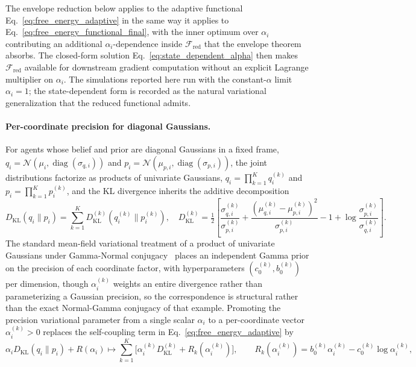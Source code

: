 \documentclass[11pt]{article}
\begin{document}
The envelope reduction below applies to the adaptive functional Eq.~\eqref{eq:free_energy_adaptive} in the same way it applies to Eq.~\eqref{eq:free_energy_functional_final}, with the inner optimum over $\alpha_i$ contributing an additional $\alpha_i$-dependence inside $\mathcal{F}_{\mathrm{red}}$ that the envelope theorem absorbs. The closed-form solution Eq.~\eqref{eq:state_dependent_alpha} then makes $\mathcal{F}_{\mathrm{red}}$ available for downstream gradient computation without an explicit Lagrange multiplier on $\alpha_i$. The simulations reported here run with the constant-$\alpha$ limit $\alpha_i = 1$; the state-dependent form is recorded as the natural variational generalization that the reduced functional admits.

\paragraph{Per-coordinate precision for diagonal Gaussians.}
\label{par:per_coord_alpha}
For agents whose belief and prior are diagonal Gaussians in a fixed frame, $q_i = \mathcal{N}(\mu_i, \operatorname{diag}(\sigma_{q,i}))$ and $p_i = \mathcal{N}(\mu_{p,i}, \operatorname{diag}(\sigma_{p,i}))$, the joint distributions factorize as products of univariate Gaussians, $q_i = \prod_{k=1}^{K} q_i^{(k)}$ and $p_i = \prod_{k=1}^{K} p_i^{(k)}$, and the KL divergence inherits the additive decomposition
\begin{equation}
D_{\mathrm{KL}}(q_i \| p_i) = \sum_{k=1}^{K} D_{\mathrm{KL}}^{(k)}(q_i^{(k)} \| p_i^{(k)}),
\quad
D_{\mathrm{KL}}^{(k)} = \tfrac{1}{2}\left[ \frac{\sigma_{q,i}^{(k)}}{\sigma_{p,i}^{(k)}} + \frac{(\mu_{q,i}^{(k)} - \mu_{p,i}^{(k)})^2}{\sigma_{p,i}^{(k)}} - 1 + \log \frac{\sigma_{p,i}^{(k)}}{\sigma_{q,i}^{(k)}} \right].
\label{eq:kl_decomposition_per_coord}
\end{equation}
The standard mean-field variational treatment of a product of univariate Gaussians under Gamma-Normal conjugacy~\cite[\S 10.1.3, \S 2.3.6]{Bishop2006} places an independent Gamma prior on the precision of each coordinate factor, with hyperparameters $(c_0^{(k)}, b_0^{(k)})$ per dimension, though $\alpha_i^{(k)}$ weights an entire divergence rather than parameterizing a Gaussian precision, so the correspondence is structural rather than the exact Normal-Gamma conjugacy of that example. Promoting the precision variational parameter from a single scalar $\alpha_i$ to a per-coordinate vector $\alpha_i^{(k)} > 0$ replaces the self-coupling term in Eq.~\eqref{eq:free_energy_adaptive} by
\begin{equation}
\alpha_i  D_{\mathrm{KL}}(q_i \| p_i) + R(\alpha_i)
\longmapsto
\sum_{k=1}^{K} \Big[\alpha_i^{(k)} D_{\mathrm{KL}}^{(k)} + R_k(\alpha_i^{(k)})\Big],
\qquad
R_k(\alpha_i^{(k)}) = b_0^{(k)} \alpha_i^{(k)} - c_0^{(k)} \log \alpha_i^{(k)},
\label{eq:adaptive_self_coupling_per_coord}
\end{equation}
\end{document}
